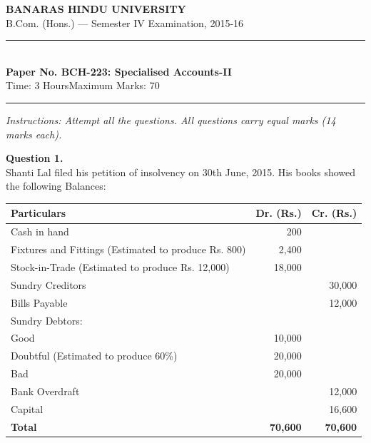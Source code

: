\documentclass[11pt,a4paper]{article}
\begin{document}
\begin{center}
  {\large\bfseries BANARAS HINDU UNIVERSITY}\\[2pt]
  {\normalsize B.Com. (Hons.) --- Semester IV Examination, 2015-16}\\[6pt]
  \rule{0.8\linewidth}{0.5pt}\\[6pt]
  {\large\bfseries Paper No. BCH-223: Specialised Accounts-II}\\[4pt]
  {\normalsize Time: 3 Hours\hfill Maximum Marks: 70}
\end{center}

\rule{\linewidth}{0.4pt}

\smallskip



\noindent   \textit{Instructions: Attempt all the questions. All questions carry equal marks (14 marks each).}

\bigskip




\noindent   \textbf{Question 1.} \\
Shanti Lal filed his petition of insolvency on 30th June, 2015. His books showed the following Balances:


\begin{center}
\small

\begin{tabular}{|l|r|r|}
\hline
   \textbf{Particulars} &   \textbf{Dr. (Rs.)} &   \textbf{Cr. (Rs.)} \\
\hline
Cash in hand & 200 & \\
Fixtures and Fittings (Estimated to produce Rs. 800) & 2,400 & \\
Stock-in-Trade (Estimated to produce Rs. 12,000) & 18,000 & \\
Sundry Creditors & & 30,000 \\
Bills Payable & & 12,000 \\
Sundry Debtors: & & \\
\quad Good & 10,000 & \\
\quad Doubtful (Estimated to produce 60\%) & 20,000 & \\
\quad Bad & 20,000 & \\
Bank Overdraft & & 12,000 \\
Capital & & 16,600 \\
\hline
   \textbf{Total} &   \textbf{70,600} &   \textbf{70,600} \\
\hline
\end{tabular}
\end{center}
\end{document}
